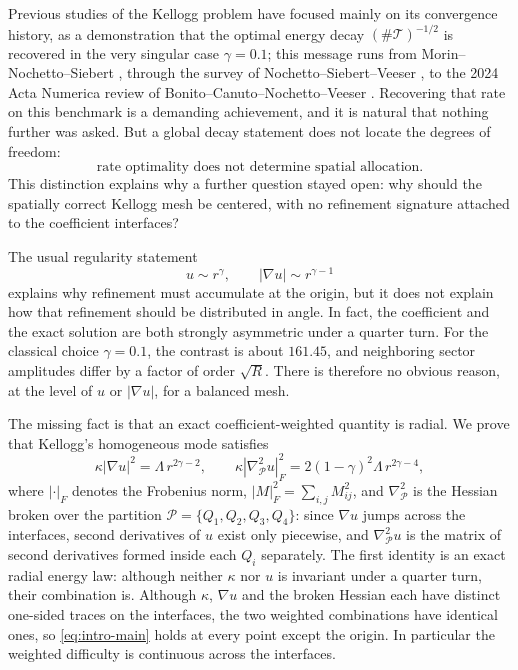 \documentclass[10pt,pdftex]{amsart}%
\numberwithin{equation}{section}
\newcommand{\Tcal}{\mathcal{T}}
\newcommand{\Pcal}{\mathcal{P}}
\newcommand{\gradb}{\nabla_{\Pcal}}
\begin{document}
Previous studies of the Kellogg problem have focused mainly on its convergence history, as a demonstration that the optimal energy decay $(\#\Tcal)^{-1/2}$ is recovered in the very singular case $\gamma=0.1$; this message runs from Morin--Nochetto--Siebert \cite{MNS}, through the survey of Nochetto--Siebert--Veeser \cite{NSV2009}, to the 2024 Acta Numerica review of Bonito--Canuto--Nochetto--Veeser \cite{BCNV2024}.  Recovering that rate on this benchmark is a demanding achievement, and it is natural that nothing further was asked.  But a global decay statement does not locate the degrees of freedom:
\begin{equation}\label{eq:rate-not-mesh}
  \boxed{\text{rate optimality does not determine spatial allocation}.}
\end{equation}
This distinction explains why a further question stayed open: why should the spatially correct Kellogg mesh be centered, with no refinement signature attached to the coefficient interfaces?

The usual regularity statement
\[
u\sim r^\gamma,\qquad |\nabla u|\sim r^{\gamma-1}
\]
explains why refinement must accumulate at the origin, but it does not explain how that refinement should be distributed in angle.  In fact, the coefficient and the exact solution are both strongly asymmetric under a quarter turn.  For the classical choice $\gamma=0.1$, the contrast is about $161.45$, and neighboring sector amplitudes differ by a factor of order $\sqrt R$.  There is therefore no obvious reason, at the level of $u$ or $|\nabla u|$, for a balanced mesh.

The missing fact is that an exact coefficient-weighted quantity is radial.  We prove that Kellogg's homogeneous mode satisfies
\begin{equation}\label{eq:intro-main}
 \kappa|\nabla u|^2=\Lambda\, r^{2\gamma-2},
 \qquad
 \kappa|\gradb^2u|_F^2=2(1-\gamma)^2\Lambda\, r^{2\gamma-4},
\end{equation}
where $|\cdot|_F$ denotes the Frobenius norm, $|M|_F^2=\sum_{i,j}M_{ij}^2$, and $\gradb^2$ is the Hessian broken over the partition $\Pcal=\{Q_1,Q_2,Q_3,Q_4\}$: since $\nabla u$ jumps across the interfaces, second derivatives of $u$ exist only piecewise, and $\gradb^2u$ is the matrix of second derivatives formed inside each $Q_i$ separately.  The first identity is an exact radial energy law: although neither $\kappa$ nor $u$ is invariant under a quarter turn, their combination is.  Although $\kappa$, $\nabla u$ and the broken Hessian each have distinct one-sided traces on the interfaces, the two weighted combinations have identical ones, so \eqref{eq:intro-main} holds at every point except the origin.  In particular the weighted difficulty is continuous across the interfaces.
\end{document}
